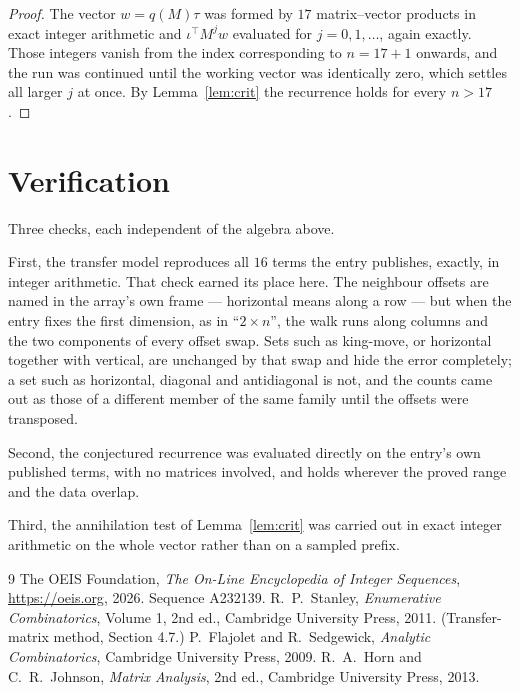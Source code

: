 \documentclass[11pt,a4paper]{article}
\theoremstyle{plain}
\theoremstyle{definition}
\begin{document}
\begin{proof}
The vector $w=q(M)\tau$ was formed by $17$ matrix--vector products in exact integer
arithmetic and $\iota^{\!\top}M^{j}w$ evaluated for $j=0,1,\dots$, again exactly. Those
integers vanish from the index corresponding to $n=17+1$ onwards, and the run was
continued until the working vector was identically zero, which settles all larger $j$ at once.
By Lemma~\ref{lem:crit} the recurrence holds for every $n>17$.
\end{proof}

\section{Verification}

Three checks, each independent of the algebra above.

First, the transfer model reproduces all $16$ terms the entry publishes, exactly, in
integer arithmetic. That check earned its place here. The neighbour offsets are named in the
array's own frame --- horizontal means along a row --- but when the entry fixes the first
dimension, as in ``$2\times n$'', the walk runs along columns and the two components of every
offset swap. Sets such as king-move, or horizontal together with vertical, are unchanged by
that swap and hide the error completely; a set such as horizontal, diagonal and antidiagonal
is not, and the counts came out as those of a different member of the same family until the
offsets were transposed.

Second, the conjectured recurrence was evaluated directly on the entry's own published terms,
with no matrices involved, and holds wherever the proved range and the data overlap.

Third, the annihilation test of Lemma~\ref{lem:crit} was carried out in exact integer
arithmetic on the whole vector rather than on a sampled prefix.

\begin{thebibliography}{9}
 The OEIS Foundation, \emph{The On-Line Encyclopedia of Integer
Sequences}, \url{https://oeis.org}, 2026. Sequence A232139.
 R.~P.~Stanley, \emph{Enumerative Combinatorics}, Volume 1, 2nd ed.,
Cambridge University Press, 2011. (Transfer-matrix method, Section 4.7.)
 P.~Flajolet and R.~Sedgewick, \emph{Analytic Combinatorics}, Cambridge
University Press, 2009.
 R.~A.~Horn and C.~R.~Johnson, \emph{Matrix Analysis}, 2nd ed., Cambridge
University Press, 2013.
\end{thebibliography}
\end{document}
